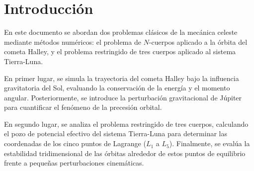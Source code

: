\section{Introducción}
En este documento se abordan dos problemas clásicos de la mecánica celeste mediante métodos numéricos: el problema de $N$-cuerpos aplicado a la órbita del cometa Halley, y el problema restringido de tres cuerpos aplicado al sistema Tierra-Luna. 

En primer lugar, se simula la trayectoria del cometa Halley bajo la influencia gravitatoria del Sol, evaluando la conservación de la energía y el momento angular. Posteriormente, se introduce la perturbación gravitacional de Júpiter para cuantificar el fenómeno de la precesión orbital. 

En segundo lugar, se analiza el problema restringido de tres cuerpos, calculando el pozo de potencial efectivo del sistema Tierra-Luna para determinar las coordenadas de los cinco puntos de Lagrange ($L_1$ a $L_5$). Finalmente, se evalúa la estabilidad tridimensional de las órbitas alrededor de estos puntos de equilibrio frente a pequeñas perturbaciones cinemáticas. 